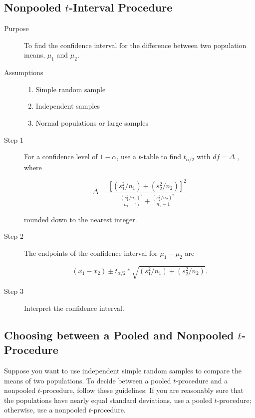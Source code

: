 \documentclass[12pt]{article}
\begin{document}
        \subsection*{Nonpooled $t$-Interval Procedure}
            \begin{description}
                \item[Purpose] To find the confidence interval for the difference between two
                population means, $\mu_1$ and $\mu_2$.
                \item[Assumptions]
                \begin{enumerate}
                   \item Simple random sample
                   \item Independent samples
                   \item Normal populations or large samples 
                \end{enumerate} 
                \item[Step 1] For a confidence level of $1-\alpha$, use a $t$-table to find
                $t_{\alpha/2}$ with $df = \Delta$ , where
                \begin{center}
                    \[
                        \Delta = \frac{[(s_1^2/n_1)+(s_2^2/n_2)]^2}
                                      {\frac{(s_1^2/n_1)^2}{n_1-1)}+
                                      \frac{(s_2^2/n_2)^2}{n_2-1}}   
                    \]
                \end{center}
                rounded down to the nearest integer.
                \item[Step 2] The endpoints of the confidence interval for $\mu_1-\mu_2$ are
                \begin{center}
                    \[
                        (\bar{x_1}-\bar{x_2}) \pm t_{\alpha/2}*\sqrt{(s_1^2/n_1)+(s_2^2/n_2)}.    
                    \]
                \end{center} 
                \item[Step 3] Interpret the confidence interval.
            \end{description}
        \subsection*{Choosing between a Pooled and Nonpooled $t$-Procedure}    
            Suppose you want to use independent simple random samples to compare the means of
            two populations. To decide between a pooled $t$-procedure and a nonpooled
            $t$-procedure, follow these guidelines: If you are reasonably sure that the populations
            have nearly equal standard deviations, use a pooled $t$-procedure; otherwise, use a
            nonpooled $t$-procedure.
    
\end{document}
